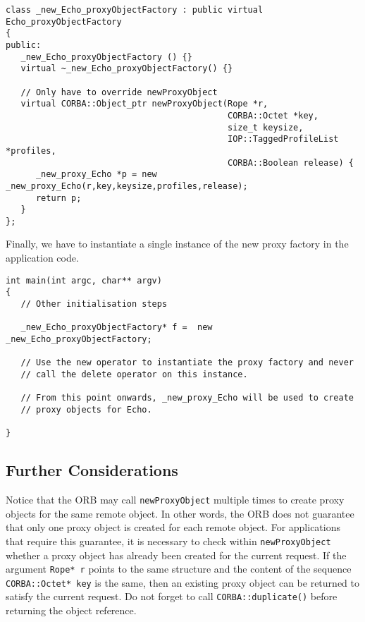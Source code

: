 \documentclass[11pt,twoside,onecolumn]{book}
\begin{document}
{\small
\begin{verbatim}
class _new_Echo_proxyObjectFactory : public virtual Echo_proxyObjectFactory
{
public:
   _new_Echo_proxyObjectFactory () {}
   virtual ~_new_Echo_proxyObjectFactory() {}

   // Only have to override newProxyObject
   virtual CORBA::Object_ptr newProxyObject(Rope *r,
                                            CORBA::Octet *key,
                                            size_t keysize,
                                            IOP::TaggedProfileList *profiles,
                                            CORBA::Boolean release) {
      _new_proxy_Echo *p = new _new_proxy_Echo(r,key,keysize,profiles,release);
      return p;
   }
};
\end{verbatim}
}

Finally, we have to instantiate a single instance of the new proxy factory
in the application code.

{\small
\begin{verbatim}
int main(int argc, char** argv)
{
   // Other initialisation steps

   _new_Echo_proxyObjectFactory* f =  new _new_Echo_proxyObjectFactory;

   // Use the new operator to instantiate the proxy factory and never
   // call the delete operator on this instance.

   // From this point onwards, _new_proxy_Echo will be used to create
   // proxy objects for Echo.

}
\end{verbatim}
}

\subsection{Further Considerations}

Notice that the ORB may call {\tt newProxyObject} multiple times to create
proxy objects for the same remote object. In other words, the ORB does not
guarantee that only one proxy object is created for each remote
object. For applications that require this guarantee, it is necessary to
check within {\tt newProxyObject} whether a proxy object has already been
created for the current request. If the argument {\tt Rope* r} points to
the same structure and the content of the sequence {\tt CORBA::Octet* key} is
the same, then an existing proxy object can be returned to satisfy the
current request. Do not forget to call {\tt CORBA::duplicate()} before
returning the object reference.
\end{document}

